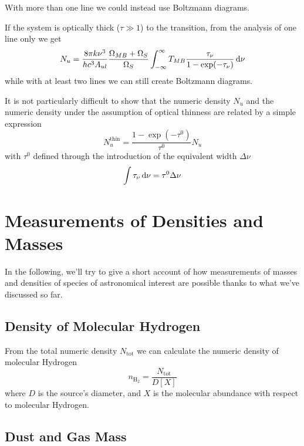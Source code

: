 With more than one line we could instead use Boltzmann diagrams.
\par If the system is optically thick ($\tau \gg 1$) to the transition, from the analysis of one line only we get 
\begin{equation}
    N_{u} = \frac{8\pi k \nu^{3}}{hc^{3} A_{ul}}\frac{\Omega_{MB}+\Omega_{S}}{\Omega_{S}}\int_{-\infty}^{\infty} T_{MB}\frac{\tau_{\nu}}{1-\exp(-\tau_{\nu})}\,\text{d}\nu
\end{equation}
while with at least two lines we can still create Boltzmann diagrams.
\par It is not particularly difficult to show that the numeric density $N_{u}$ and the numeric density under the assumption of optical thinness are related by a simple expression 
\begin{equation}
    N_{u}^{\text{thin}} = \frac{1-\exp(-\tau^{0})}{\tau^{0}}N_{u}
\end{equation}
with $\tau^{0}$ defined through the introduction of the equivalent width $\Delta\nu$ 
\begin{equation}
    \int \tau_{\nu}\,\text{d}\nu = \tau^{0}\Delta\nu
\end{equation}

\section{Measurements of Densities and Masses}

In the following, we'll try to give a short account of how measurements of masses and densities of species of astronomical interest are possible thanks to what we've discussed so far.

\subsection{Density of Molecular Hydrogen}

From the total numeric density $N_{\text{tot}}$ we can calculate the numeric density of molecular Hydrogen
\begin{equation}
    n_{\text{H}_{2}} = \frac{N_{\text{tot}}}{D[X]}
\end{equation}
where $D$ is the source's diameter, and $X$ is the molecular abundance with respect to molecular Hydrogen.

\subsection{Dust and Gas Mass}

